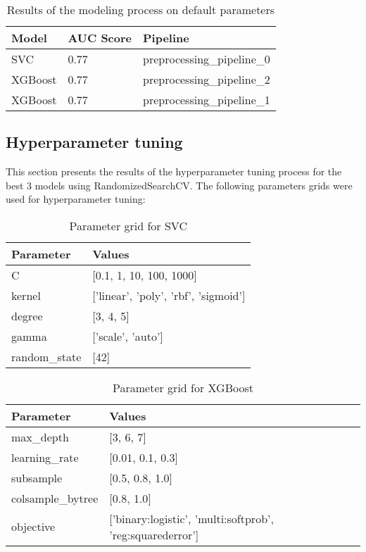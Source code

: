 \documentclass{article}%
\begin{document}
\begin{table}[H]%
\begin{center}%
\begin{tabular}{p{30mm} p{20mm} p{50mm}}%
\hline%
\textbf{Model}&\textbf{AUC Score}&\textbf{Pipeline}\\%
\hline%
SVC&0.77&preprocessing\_pipeline\_0\\%
XGBoost&0.77&preprocessing\_pipeline\_2\\%
XGBoost&0.77&preprocessing\_pipeline\_1\\%
\hline%
\end{tabular}%
\end{center}%
\caption{Results of the modeling process on default parameters}%
\end{table}

%
\subsection{Hyperparameter tuning}%
\label{subsec:Hyperparametertuning}%

%
This section presents the results of the hyperparameter tuning process for the best 3 models using RandomizedSearchCV.%
The following parameters grids were used for hyperparameter tuning:%


\begin{table}[H]%
\begin{center}%
\begin{tabular}{p{30mm} p{70mm}}%
\hline%
\textbf{Parameter}&\textbf{Values}\\%
\hline%
C&{[}0.1, 1, 10, 100, 1000{]}\\%
kernel&{[}'linear', 'poly', 'rbf', 'sigmoid'{]}\\%
degree&{[}3, 4, 5{]}\\%
gamma&{[}'scale', 'auto'{]}\\%
random\_state&{[}42{]}\\%
\hline%
\end{tabular}%
\end{center}%
\caption{Parameter grid for SVC}%
\end{table}

%


\begin{table}[H]%
\begin{center}%
\begin{tabular}{p{30mm} p{70mm}}%
\hline%
\textbf{Parameter}&\textbf{Values}\\%
\hline%
max\_depth&{[}3, 6, 7{]}\\%
learning\_rate&{[}0.01, 0.1, 0.3{]}\\%
subsample&{[}0.5, 0.8, 1.0{]}\\%
colsample\_bytree&{[}0.8, 1.0{]}\\%
objective&{[}'binary:logistic', 'multi:softprob', 'reg:squarederror'{]}\\%
\hline%
\end{tabular}%
\end{center}%
\caption{Parameter grid for XGBoost}%
\end{table}
\end{document}
